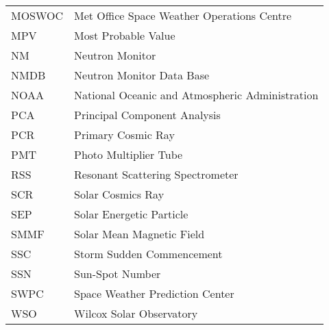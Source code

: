 \begin{tabular}{l l}
	{MOSWOC}	&	{Met Office Space Weather Operations Centre}	\\		
	{MPV}  & {Most Probable Value} \\
	{NM}	&	{Neutron Monitor}	\\				
	{NMDB}	&	{Neutron Monitor Data Base}	\\				
	{NOAA} & {National Oceanic and Atmospheric Administration} \\
	{PCA}  & {Principal Component Analysis} 	\\
	{PCR}	&	{Primary Cosmic Ray}	\\		
	{PMT}	&	{Photo Multiplier Tube}	\\		
	{RSS}  &  {Resonant Scattering Spectrometer} \\
	{SCR}  & {Solar Cosmics Ray} \\
	{SEP}	&	{Solar Energetic Particle}	\\	
	{SMMF} & {Solar Mean Magnetic Field} \\
	{SSC}	&	{Storm Sudden Commencement}	\\		
	{SSN}	&	{Sun-Spot Number}	\\
	{SWPC} & {Space Weather Prediction Center} \\
	{WSO} & {Wilcox Solar Observatory} \\
\end{tabular}
